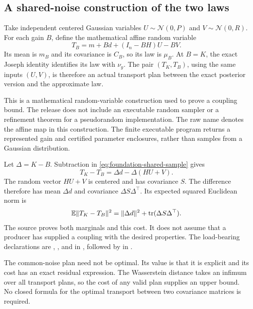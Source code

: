 \subsection{A shared-noise construction of the two laws}

Take independent centered Gaussian variables $U\sim\mathcal N(0,P)$ and $V\sim\mathcal N(0,R)$. For each gain $B$, define the mathematical affine random variable
\begin{equation}
 T_B=m+Bd+(I_n-BH)U-BV.
 \label{eq:foundation-shared-sample}
\end{equation}
Its mean is $m_B$ and its covariance is $C_B$, so its law is $\mu_B$. At $B=K$, the exact Joseph identity identifies its law with $\nu_y$. The pair $(T_K,T_B)$, using the same inputs $(U,V)$, is therefore an actual transport plan between the exact posterior version and the approximate law.

This is a mathematical random-variable construction used to prove a coupling bound. The release does not include an executable random sampler or a refinement theorem for a pseudorandom implementation. The raw name  denotes the affine map in this construction. The finite executable program returns a represented gain and certified parameter enclosures, rather than samples from a Gaussian distribution.

Let $\Delta=K-B$. Subtraction in \eqref{eq:foundation-shared-sample} gives
\[
 T_K-T_B=\Delta d-\Delta(HU+V).
\]
The random vector $HU+V$ is centered and has covariance $S$. The difference therefore has mean $\Delta d$ and covariance $\Delta S\Delta^\top$. Its expected squared Euclidean norm is
\begin{equation}
 \mathbb E\|T_K-T_B\|^2
   =\|\Delta d\|^2+\operatorname{tr}(\Delta S\Delta^\top).
 \label{eq:foundation-coupling-cost}
\end{equation}
The source proves both marginals and this cost. It does not assume that a producer has supplied a coupling with the desired properties. The load-bearing declarations are , , and  in , followed by  in .

The common-noise plan need not be optimal. Its value is that it is explicit and its cost has an exact residual expression. The Wasserstein distance takes an infimum over all transport plans, so the cost of any valid plan supplies an upper bound. No closed formula for the optimal transport between two covariance matrices is required.

